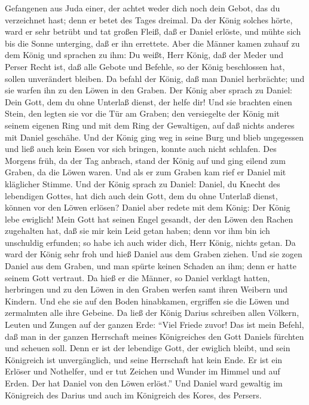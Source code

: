 Gefangenen aus Juda einer, der achtet weder dich noch dein Gebot, das du
verzeichnet hast; denn er betet des Tages dreimal.  Da der
König solches hörte, ward er sehr betrübt und tat großen Fleiß, daß er
Daniel erlöste, und mühte sich bis die Sonne unterging, daß er ihn
errettete.  Aber die Männer kamen zuhauf zu dem König und
sprachen zu ihm: Du weißt, Herr König, daß der Meder und Perser Recht
ist, daß alle Gebote und Befehle, so der König beschlossen hat, sollen
unverändert bleiben.  Da befahl der König, daß man Daniel
herbrächte; und sie warfen ihn zu den Löwen in den Graben. Der König
aber sprach zu Daniel: Dein Gott, dem du ohne Unterlaß dienst, der helfe
dir!  Und sie brachten einen Stein, den legten sie vor die
Tür am Graben; den versiegelte der König mit seinem eigenen Ring und mit
dem Ring der Gewaltigen, auf daß nichts anderes mit Daniel geschähe.
 Und der König ging weg in seine Burg und blieb ungegessen
und ließ auch kein Essen vor sich bringen, konnte auch nicht schlafen.
 Des Morgens früh, da der Tag anbrach, stand der König auf
und ging eilend zum Graben, da die Löwen waren.  Und als er
zum Graben kam rief er Daniel mit kläglicher Stimme. Und der König
sprach zu Daniel: Daniel, du Knecht des lebendigen Gottes, hat dich auch
dein Gott, dem du ohne Unterlaß dienst, können vor den Löwen erlösen?
 Daniel aber redete mit dem König: Der König lebe ewiglich!
 Mein Gott hat seinen Engel gesandt, der den Löwen den
Rachen zugehalten hat, daß sie mir kein Leid getan haben; denn vor ihm
bin ich unschuldig erfunden; so habe ich auch wider dich, Herr König,
nichts getan.  Da ward der König sehr froh und hieß Daniel
aus dem Graben ziehen. Und sie zogen Daniel aus dem Graben, und man
spürte keinen Schaden an ihm; denn er hatte seinem Gott vertraut.
 Da hieß er die Männer, so Daniel verklagt hatten,
herbringen und zu den Löwen in den Graben werfen samt ihren Weibern und
Kindern. Und ehe sie auf den Boden hinabkamen, ergriffen sie die Löwen
und zermalmten alle ihre Gebeine.  Da ließ der König Darius
schreiben allen Völkern, Leuten und Zungen auf der ganzen Erde: ``Viel
Friede zuvor!  Das ist mein Befehl, daß man in der ganzen
Herrschaft meines Königreiches den Gott Daniels fürchten und scheuen
soll. Denn er ist der lebendige Gott, der ewiglich bleibt, und sein
Königreich ist unvergänglich, und seine Herrschaft hat kein Ende.
 Er ist ein Erlöser und Nothelfer, und er tut Zeichen und
Wunder im Himmel und auf Erden. Der hat Daniel von den Löwen erlöst.''
 Und Daniel ward gewaltig im Königreich des Darius und auch
im Königreich des Kores, des Persers.

